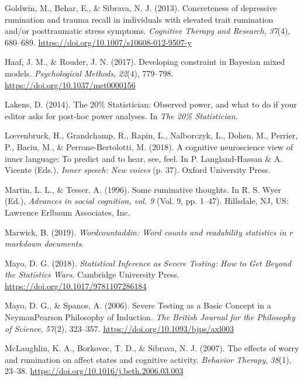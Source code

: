 \documentclass[
  english,
  man, donotrepeattitle,floatsintext]{apa6}
\newlength{\cslhangindent}
\newenvironment{cslreferences}%
  {\setlength{\parindent}{0pt}%
  \everypar{\setlength{\hangindent}{\cslhangindent}}\ignorespaces}%
  {\par}
\begin{document}
\begin{cslreferences}
\leavevmode\hypertarget{ref-goldwin_concreteness_2013}{}%
Goldwin, M., Behar, E., \& Sibrava, N. J. (2013). Concreteness of depressive rumination and trauma recall in individuals with elevated trait rumination and/or posttraumatic stress symptoms. \emph{Cognitive Therapy and Research}, \emph{37}(4), 680--689. \url{https://doi.org/10.1007/s10608-012-9507-y}

\leavevmode\hypertarget{ref-haaf_developing_2017}{}%
Haaf, J. M., \& Rouder, J. N. (2017). Developing constraint in Bayesian mixed models. \emph{Psychological Methods}, \emph{22}(4), 779--798. \url{https://doi.org/10.1037/met0000156}

\leavevmode\hypertarget{ref-lakens_20_2014}{}%
Lakens, D. (2014). The 20\% Statistician: Observed power, and what to do if your editor asks for post-hoc power analyses. In \emph{The 20\% Statistician}.

\leavevmode\hypertarget{ref-loevenbruck_cognitive_2018}{}%
Lœvenbruck, H., Grandchamp, R., Rapin, L., Nalborczyk, L., Dohen, M., Perrier, P., Baciu, M., \& Perrone-Bertolotti, M. (2018). A cognitive neuroscience view of inner language: To predict and to hear, see, feel. In P. Langland-Hassan \& A. Vicente (Eds.), \emph{Inner speech: New voices} (p. 37). Oxford University Press.

\leavevmode\hypertarget{ref-Martin}{}%
Martin, L. L., \& Tesser, A. (1996). Some ruminative thoughts. In R. S. Wyer (Ed.), \emph{Advances in social cognition, vol. 9} (Vol. 9, pp. 1--47). Hillsdale, NJ, US: Lawrence Erlbaum Associates, Inc.

\leavevmode\hypertarget{ref-R-wordcountaddin}{}%
Marwick, B. (2019). \emph{Wordcountaddin: Word counts and readability statistics in r markdown documents}.

\leavevmode\hypertarget{ref-mayo_statistical_2018}{}%
Mayo, D. G. (2018). \emph{Statistical Inference as Severe Testing: How to Get Beyond the Statistics Wars}. Cambridge University Press. \url{https://doi.org/10.1017/9781107286184}

\leavevmode\hypertarget{ref-mayo_severe_2006}{}%
Mayo, D. G., \& Spanos, A. (2006). Severe Testing as a Basic Concept in a NeymanPearson Philosophy of Induction. \emph{The British Journal for the Philosophy of Science}, \emph{57}(2), 323--357. \url{https://doi.org/10.1093/bjps/axl003}

\leavevmode\hypertarget{ref-mclaughlin_effects_2007}{}%
McLaughlin, K. A., Borkovec, T. D., \& Sibrava, N. J. (2007). The effects of worry and rumination on affect states and cognitive activity. \emph{Behavior Therapy}, \emph{38}(1), 23--38. \url{https://doi.org/10.1016/j.beth.2006.03.003}


\end{cslreferences}
\end{document}
